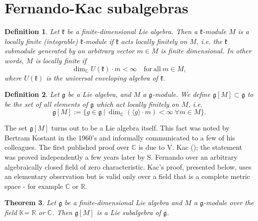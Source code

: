 \documentclass[12pt]{report}
\newtheorem{theo}{Theorem}[section]
\newtheorem{defi}[theo]{Definition}
\newcommand {\CC} {\mathbb {C}}
\newcommand {\RR} {\mathbb {R}}
\newcommand {\KK} {\mathbb {K}}
\newcommand{\kk}{\mathfrak{k}}
\newcommand{\gG}{\mathfrak{g}}
\begin{document}
\section{Fernando-Kac subalgebras} \label{secOrigin}
\begin{defi}
Let $\kk$ be a finite-dimensional Lie algebra. Then a $\kk$-module $M$ is a locally finite (integrable) $\kk$-module if $\kk$ acts locally finitely on $M$, i.e. the $\kk$ submodule generated by an arbitrary vector $m\in M$ is finite dimensional. In other words, $M$ is locally finite if
\[
\dim_\CC U(\kk)\cdot m<\infty \quad \mathrm{for~all~}m\in M,
\]
where  $U(\kk)$ is the universal enveloping algebra of $\kk$.
\end{defi}
\begin{defi}\label{defg[M]}
Let $\gG$ be a Lie algebra, and $M$ a $\gG$-module. We define $\gG[M]\subset\gG$ to be the set of all elements of $\gG$ which act locally finitely on $M$, i.e.
\[
\gG[M]:=\{g\in\gG~|~\dim_\CC (\langle g\rangle \cdot m)<\infty ~\forall m\in M\}.
\]
\end{defi}
The set $\gG[M]$ turns out to be a Lie algebra itself. This fact was noted by Bertram Kostant in the 1960's and informally communicated to a few of his colleagues. The first published proof over $\CC$ is due to V. Kac (\cite{Kac:FernandoKacSubalgebra}); the statement was proved independently a few years later by S. Fernando over an arbitrary algebraically closed field of zero characteristic. Kac's proof, presented below, uses an elementary observation but is valid only over a field that is a complete metric space - for example $\CC$ or $\RR$.
\begin{theo}\label{thFernando-Kac}
Let $\gG$ be a finite-dimensional Lie algebra and $M$ a $\gG$-module over the field $\KK$= $\RR$ or $\CC$. Then $\gG[M]$ is a Lie subalgebra of $\gG$. 
\end{theo}
\end{document}
